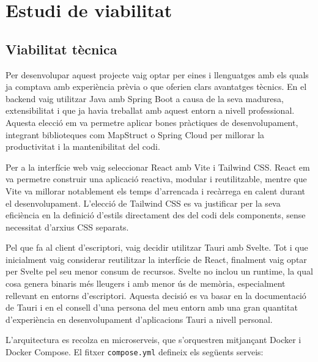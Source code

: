 

\chapter{Estudi de viabilitat}

\section{Viabilitat t\`ecnica}

Per desenvolupar aquest projecte vaig optar per eines i llenguatges amb els quals ja comptava amb experi\`encia pr\`evia o que oferien clars avantatges t\`ecnics. En el backend vaig utilitzar Java amb Spring Boot a causa de la seva maduresa, extensibilitat i que ja havia treballat amb aquest entorn a nivell professional. Aquesta elecci\'o em va permetre aplicar bones pr\`actiques de desenvolupament, integrant biblioteques com MapStruct o Spring Cloud per millorar la productivitat i la mantenibilitat del codi.

Per a la interf\'icie web vaig seleccionar React amb Vite i Tailwind CSS. React em va permetre construir una aplicaci\'o reactiva, modular i reutilitzable, mentre que Vite va millorar notablement els temps d'arrencada i rec\`arrega en calent durant el desenvolupament. L'elecci\'o de Tailwind CSS es va justificar per la seva efici\`encia en la definici\'o d'estils directament des del codi dels components, sense necessitat d'arxius CSS separats.

Pel que fa al client d'escriptori, vaig decidir utilitzar Tauri amb Svelte. Tot i que inicialment vaig considerar reutilitzar la interf\'icie de React, finalment vaig optar per Svelte pel seu menor consum de recursos. Svelte no inclou un runtime, la qual cosa genera binaris m\'es lleugers i amb menor \'us de mem\`oria, especialment rellevant en entorns d'escriptori. Aquesta decisi\'o es va basar en la documentaci\'o de Tauri i en el consell d'una persona del meu entorn amb una gran quantitat d'experi\`encia en desenvolupament d'aplicacions Tauri a nivell personal.

L'arquitectura es recolza en microserveis, que s'orquestren mitjan\c{c}ant Docker i Docker Compose. El fitxer \texttt{compose.yml} defineix els seg\"uents serveis:

